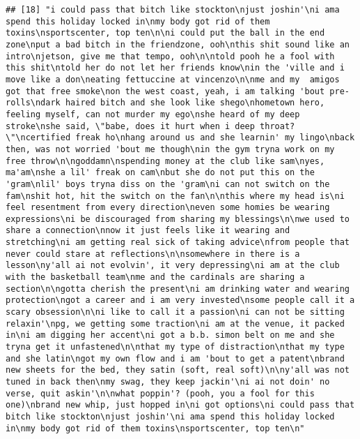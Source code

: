 \documentclass[]{article}
\begin{document}
\begin{verbatim}
## [18] "i could pass that bitch like stockton\njust joshin'\ni ama spend this holiday locked in\nmy body got rid of them toxins\nsportscenter, top ten\n\ni could put the ball in the end zone\nput a bad bitch in the friendzone, ooh\nthis shit sound like an intro\njetson, give me that tempo, ooh\n\ntold pooh he a fool with this shit\ntold her do not let her friends know\nin the 'ville and i move like a don\neating fettuccine at vincenzo\n\nme and my  amigos got that free smoke\non the west coast, yeah, i am talking 'bout pre-rolls\ndark haired bitch and she look like shego\nhometown hero, feeling myself, can not murder my ego\nshe heard of my deep stroke\nshe said, \"babe, does it hurt when i deep throat?\"\ncertified freak ho\nhang around us and she learnin' my lingo\nback then, was not worried 'bout me though\nin the gym tryna work on my free throw\n\ngoddamn\nspending money at the club like sam\nyes, ma'am\nshe a lil' freak on cam\nbut she do not put this on the 'gram\nlil' boys tryna diss on the 'gram\ni can not switch on the fam\nshit hot, hit the switch on the fan\n\nthis where my head is\ni feel resentment from every direction\neven some homies be wearing expressions\ni be discouraged from sharing my blessings\n\nwe used to share a connection\nnow it just feels like it wearing and stretching\ni am getting real sick of taking advice\nfrom people that never could stare at reflections\n\nsomewhere in there is a lesson\ny'all ai not evolvin', it very depressing\ni am at the club with the basketball team\nme and the cardinals are sharing a section\n\ngotta cherish the present\ni am drinking water and wearing protection\ngot a career and i am very invested\nsome people call it a scary obsession\n\ni like to call it a passion\ni can not be sitting relaxin'\npg, we getting some traction\ni am at the venue, it packed in\ni am digging her accent\ni got a b.b. simon belt on me and she tryna get it unfastened\n\nthat my type of distraction\nthat my type and she latin\ngot my own flow and i am 'bout to get a patent\nbrand new sheets for the bed, they satin (soft, real soft)\n\ny'all was not tuned in back then\nmy swag, they keep jackin'\ni ai not doin' no verse, quit askin'\n\nwhat poppin'? (pooh, you a fool for this one)\nbrand new whip, just hopped in\ni got options\ni could pass that bitch like stockton\njust joshin'\ni ama spend this holiday locked in\nmy body got rid of them toxins\nsportscenter, top ten\n"                                                                                                                                                                                                                                                                                                                                                                                                                                                                                                                                                                                                                                                                                                                                                                                                                                                                                                       
\end{verbatim}
\end{document}
